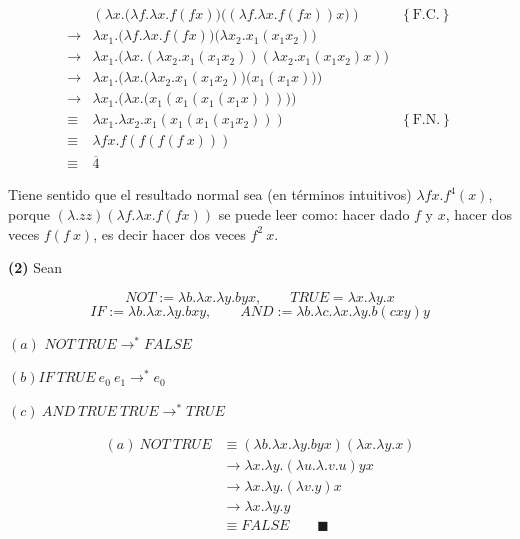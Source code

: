 \documentclass[article, 12pt]{article}
\begin{document}
\begin{align*}
&\left( \lambda x. \Big( \lambda f. \lambda x. f(fx) \Big)\Big( \left(
\lambda f. \lambda x. f(fx) \right)x  \Big) \right) &\left\{ \text{F.C.}
\right\} \\ 
\to & \lambda x_1. \Big( \lambda f. \lambda x. f(fx) \Big)\Big( \lambda x_2. x_1
(x_1 x_2)\Big) \\
  \to &\lambda x_1. \Big( \lambda x.(\lambda x_2. x_1(x_1 x_2)) \left( \lambda
  x_2. x_1 (x_1 x_2) x \right)  \Big)\\ 
      \to & \lambda x_1 . \Big( \lambda x. \big( \lambda x_2. x_1(x_1 x_2) \big)
      \big( x_1(x_1 x) \big)\Big) \\ 
\to & \lambda x_1. \Big( \lambda x. \big(  x_1 (x_1(x_1(x_1 x))) \big) \Big) \\ 
\equiv ~&\lambda x_1.\lambda x_2. x_1(x_1(x_1(x_1 x_2))) &\left\{ \text{F.N.}
\right\}  \\ 
  \equiv ~&\lambda f x. f(f(f( f ~ x))) \\ 
  \equiv~& \overline{4}
\end{align*}

Tiene sentido que el resultado normal sea (en términos intuitivos) $\lambda fx.f^4(x)$,
porque $(\lambda .zz)(\lambda f. \lambda x. f(fx))$ se puede leer como: hacer
dado $f$ y $x$, hacer dos veces $f(f ~ x)$, es decir hacer dos veces $f^2 ~ x$.
\pagebreak 

\begin{myframe}

  \textbf{(2)} Sean 

  \begin{equation*}
    NOT := \lambda b. \lambda x. \lambda y. byx, \qquad TRUE = \lambda x.
    \lambda y. x
  \end{equation*}
  \begin{equation*}
    IF := \lambda b. \lambda x. \lambda y. bxy, \qquad AND := \lambda b. \lambda
    c. \lambda x. \lambda y. b(cxy)y
  \end{equation*}

  $(a)$ $NOT ~ TRUE \to^* FALSE$

  $(b) IF ~ TRUE ~ e_0 ~ e_1 \to^* e_0$

  $(c) ~ AND ~ TRUE ~ TRUE \to^* TRUE$

\end{myframe}

\begin{align*}
  (a) ~ NOT ~ TRUE 
  &\equiv (\lambda b. \lambda x. \lambda y. byx) (\lambda x. \lambda
  y. x) \\ 
  &\to \lambda x. \lambda y. (\lambda u. \lambda. v. u)yx \\ 
  &\to \lambda x. \lambda y. (\lambda v.y) x \\ 
  &\to \lambda x. \lambda y. y \\ 
  &\equiv  FALSE \qquad \blacksquare
\end{align*}
\end{document}

